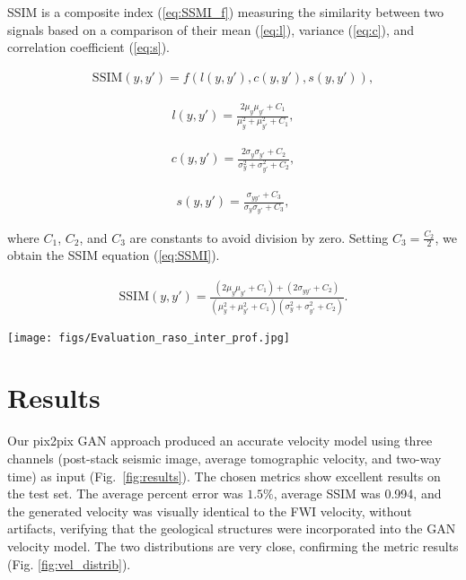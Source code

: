 \documentclass[conference]{IEEEtran}
\begin{document}
SSIM is a composite index (\ref{eq:SSMI_f}) measuring the similarity between two signals based on a comparison of their mean (\ref{eq:l}), variance (\ref{eq:c}), and correlation coefficient (\ref{eq:s}).

\begin{align}
  \mathrm{SSIM}(y,{y}') = f(l(y,{y}'),c(y,{y}'),s(y,{y}')),
  \label{eq:SSMI_f}
\end{align}

\begin{align}
    l(y,{y}') =\frac{2\mu_y\mu_{{y}'} + C_1}{\mu_y^2 + \mu_{{y}'}^2+ C_1},  \label{eq:l}
\end{align}

\begin{align}
    c(y,{y}') =\frac{2\sigma_y\sigma_{{y}'} + C_2}{\sigma_y^2 + \sigma_{{y}'}^2+ C_2},  \label{eq:c}
\end{align}

\begin{align}
    s(y,{y}') =\frac{\sigma_{y{y}'} + C_3}{\sigma_y \sigma_{{y}'}+ C_3},  \label{eq:s}
\end{align}

where $C_1$, $C_2$, and $C_3$ are constants to avoid division by zero. Setting $C_3 = \frac{C_2}{2}$, we obtain the SSIM equation (\ref{eq:SSMI}).

\begin{align}
  \mathrm{SSIM}(y,{y}') = \frac{(2\mu_y\mu_{{y}'} + C_1) + (2 \sigma _{y{y}'} + C_2)} 
    {(\mu_y^2 + \mu_{{y}'}^2+C_1) (\sigma_y^2 + \sigma_{{y}'}^2+C_2)}.
  \label{eq:SSMI}
\end{align}

\begin{figure*}[tbh]
 \centering
 \texttt{[image: figs/Evaluation\_raso\_inter\_prof.jpg]}
  \caption{FWI velocity, GAN velocity, percent error, and SSIM map over three representative patches (shallow, intermediate, and deep regions from top to bottom, respectively).}
 \label{fig:results}
\end{figure*}
\section{Results}

Our pix2pix GAN approach produced an accurate velocity model using three channels (post-stack seismic image, average tomographic velocity, and two-way time) as input (Fig.~\ref{fig:results}).
The chosen metrics show excellent results on the test set. The average percent error was  $1.5\%$, average SSIM was 0.994, and the generated velocity was visually identical to the FWI velocity, without artifacts, verifying that the geological structures were incorporated into the GAN velocity model. 
The two distributions are very close, confirming the metric results (Fig. \ref{fig:vel_distrib}).
\end{document}
